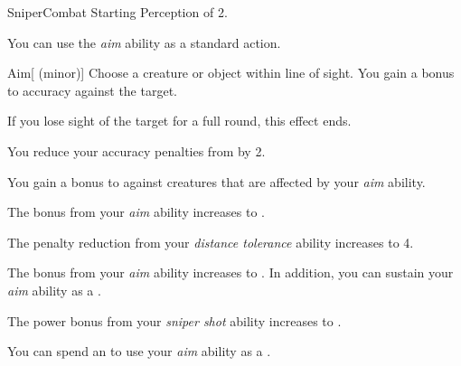     \begin{feat}{Sniper}{Combat}
        \featpre Starting Perception of 2.

         You can use the \textit{aim} ability as a standard action.
        \begin{freeability}{Aim}[ (minor)]
            Choose a creature or object within line of sight.
            You gain a  bonus to accuracy against the target.

            If you lose sight of the target for a full round, this effect ends.
        \end{freeability}

         You reduce your accuracy penalties from  by 2.

         You gain a  bonus to  against \unaware creatures that are affected by your \textit{aim} ability.

         The bonus from your \textit{aim} ability increases to .

         The penalty reduction from your \textit{distance tolerance} ability increases to 4.

         The bonus from your \textit{aim} ability increases to .
        In addition, you can sustain your \textit{aim} ability as a .

         The power bonus from your \textit{sniper shot} ability increases to .

         You can spend an  to use your \textit{aim} ability as a .
    \end{feat}

